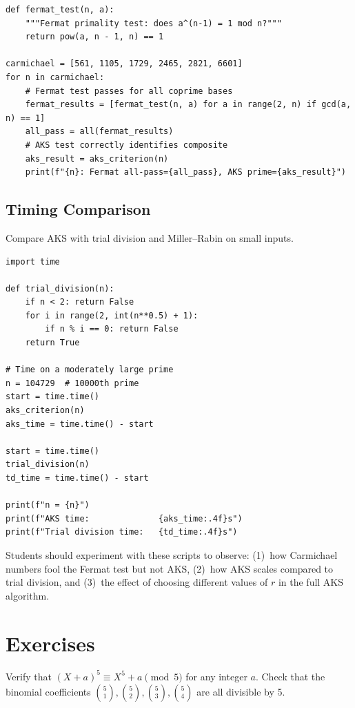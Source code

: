 \begin{verbatim}
def fermat_test(n, a):
    """Fermat primality test: does a^(n-1) = 1 mod n?"""
    return pow(a, n - 1, n) == 1

carmichael = [561, 1105, 1729, 2465, 2821, 6601]
for n in carmichael:
    # Fermat test passes for all coprime bases
    fermat_results = [fermat_test(n, a) for a in range(2, n) if gcd(a, n) == 1]
    all_pass = all(fermat_results)
    # AKS test correctly identifies composite
    aks_result = aks_criterion(n)
    print(f"{n}: Fermat all-pass={all_pass}, AKS prime={aks_result}")
\end{verbatim}

\subsection{Timing Comparison}

Compare AKS with trial division and Miller--Rabin on small inputs.

\begin{verbatim}
import time

def trial_division(n):
    if n < 2: return False
    for i in range(2, int(n**0.5) + 1):
        if n % i == 0: return False
    return True

# Time on a moderately large prime
n = 104729  # 10000th prime
start = time.time()
aks_criterion(n)
aks_time = time.time() - start

start = time.time()
trial_division(n)
td_time = time.time() - start

print(f"n = {n}")
print(f"AKS time:              {aks_time:.4f}s")
print(f"Trial division time:   {td_time:.4f}s")
\end{verbatim}

\begin{highlightbox}
Students should experiment with these scripts to observe: (1)~how Carmichael numbers fool the Fermat test but not AKS, (2)~how AKS scales compared to trial division, and (3)~the effect of choosing different values of $r$ in the full AKS algorithm.
\end{highlightbox}

\section{Exercises}

\begin{exercise}[Basic]
Verify that $(X + a)^5 \equiv X^5 + a \pmod{5}$ for any integer $a$. Check that the binomial coefficients $\binom{5}{1}, \binom{5}{2}, \binom{5}{3}, \binom{5}{4}$ are all divisible by 5.
\end{exercise}

